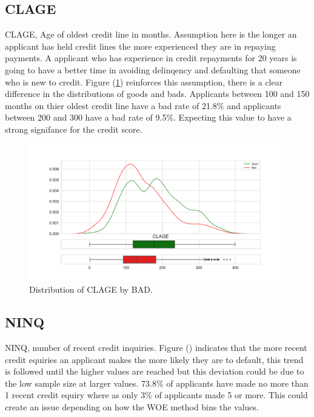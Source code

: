 \subsection*{CLAGE}

CLAGE,  Age of oldest credit line in months. Assumption here is the longer an applicant has held credit lines the more experienced they are in repaying payments. A applicant who has experience in credit repayments for 20 years is going to have a better time in avoiding delinqency and defaulting that someone who is new to credit. Figure (\ref{clage_dist}) reinforces this assumption,  there is a clear difference in the distributions of goods and bads. Applicants between 100 and 150 months on thier oldest credit line have a bad rate of 21.8\% and applicants between 200 and 300 have a bad rate of 9.5\%. Expecting this value to have a strong signifance for the credit score.

\begin{figure}[!ht]
	\centering
	\includegraphics[scale=0.40]{figs/clage_dist.pdf}
	\caption{Distribution of CLAGE by BAD. \label{clage_dist}}
\end{figure}

\subsection*{NINQ}

NINQ,  number of recent credit inquiries. Figure (\label{ninq_cat}) indicates that the more recent credit equiries an applicant makes the more likely they are to default,  this trend is followed until the higher values are reached but this deviation could be due to the low sample size at larger values. 73.8\% of applicants have made no more than 1 recent credit equiry where as only 3\% of applicants made 5 or more. This could create an issue depending on how the WOE method bins the values.

